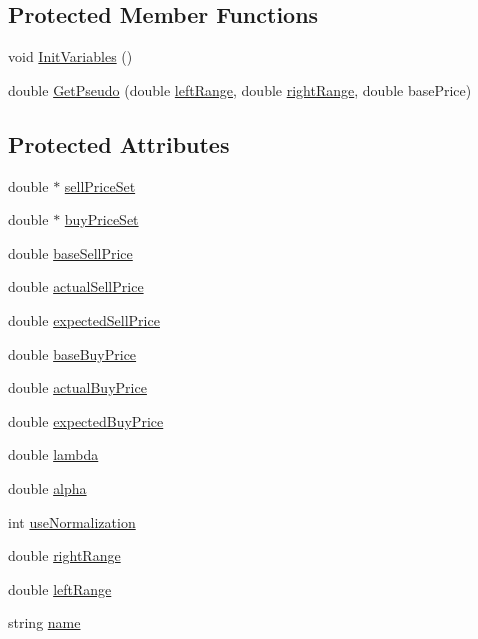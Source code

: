 \subsection*{Protected Member Functions}
\begin{DoxyCompactItemize}
\item 
void \hyperlink{classprice_a84cb52c47624df899791468c95eb2795}{InitVariables} ()
\item 
double \hyperlink{classprice_a90af5d98d40acceec149c02cd627e1f5}{GetPseudo} (double \hyperlink{classprice_a11c455e9b6de902a4783857a77023ff9}{leftRange}, double \hyperlink{classprice_a63c86ef8691125451415316a12ab27d6}{rightRange}, double basePrice)
\end{DoxyCompactItemize}
\subsection*{Protected Attributes}
\begin{DoxyCompactItemize}
\item 
double $\ast$ \hyperlink{classprice_a11a4ea5a1276f0b76a5de77996a08c57}{sellPriceSet}
\item 
double $\ast$ \hyperlink{classprice_a47707ef8bd8a9a461a52997048b7c793}{buyPriceSet}
\item 
double \hyperlink{classprice_a17cc243dcdc8e2de14a5365e7ce733dd}{baseSellPrice}
\item 
double \hyperlink{classprice_a56b644fc355c61a06c563e83587562f8}{actualSellPrice}
\item 
double \hyperlink{classprice_abb334aaef5a8e3aeb9df5edf865265b7}{expectedSellPrice}
\item 
double \hyperlink{classprice_a9b5a8957965dbf9864e0c21f007dab1d}{baseBuyPrice}
\item 
double \hyperlink{classprice_ad5017cef2e0f61e7cca4c501daf0c8f1}{actualBuyPrice}
\item 
double \hyperlink{classprice_a04ddcd6b09b1b4aa70a064d57519753e}{expectedBuyPrice}
\item 
double \hyperlink{classprice_af9b587a47c6db2a06ccac564b586d9bc}{lambda}
\item 
double \hyperlink{classprice_ad71f7d198361764503defc6c0f5205eb}{alpha}
\item 
int \hyperlink{classprice_a9ad87ecbc5d76b3ceaa1e664cca3f6ab}{useNormalization}
\item 
double \hyperlink{classprice_a63c86ef8691125451415316a12ab27d6}{rightRange}
\item 
double \hyperlink{classprice_a11c455e9b6de902a4783857a77023ff9}{leftRange}
\item 
string \hyperlink{classprice_a210d75a2f9bbb32dcefabf169aadea87}{name}
\end{DoxyCompactItemize}

